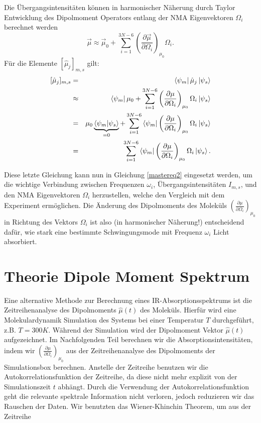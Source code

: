 \documentclass[a4paper,12pt]{article}
\begin{document}
Die Übergangsintensitäten können in harmonischer Näherung durch Taylor Entwicklung des Dipolmoment Operators entlang der NMA Eigenvektoren $\Omega_i$ berechnet werden
\begin{equation}\label{mutaylor}
 \vec{\mu} \approx  \vec{\mu}_0 + \sum_{i=1}^{3N-6} \left(\frac{\partial \vec{\mu}}{\partial \Omega_i}\right)_{\mu_0} \Omega_i.
\end{equation}
Für die Elemente $[\hat{\mu}_j]_{m,s}$ gilt:
\begin{eqnarray}\label{maximu}
  [\hat{\mu}_j]_{m,s}&=&\bra{\psi_m}\hat{\mu}_j \ket{\psi_s} \nonumber \\
                     &\approx&\bra{\psi_m} \mu_0 + \sum_{i=1}^{3N-6} \left(\frac{\partial \mu}{\partial \Omega_i}\right)_{\mu_0} \Omega_i \ket{\psi_s} \nonumber\\
                     &=&\mu_0 \underbrace{\braket{\psi_m|\psi_s}}_{=0} + \sum_{i=1}^{3N-6} \bra{\psi_m}  \left(\frac{\partial \mu}{\partial \Omega_i}\right)_{\mu_0} \Omega_i \ket{\psi_s} \nonumber\\
                     &=&\sum_{i=1}^{3N-6} \bra{\psi_m}  \left(\frac{\partial \mu}{\partial \Omega_i}\right)_{\mu_0} \Omega_i \ket{\psi_s}.
\end{eqnarray}

Diese letzte Gleichung kann nun in Gleichung \ref{mastereq2} eingesetzt werden, um die wichtige Verbindung zwischen Frequenzen $\omega_i$, Übergangsintensitäten $I_{m,s}$, und den NMA
Eigenvektoren $\Omega_i$ herzustellen, welche den Vergleich mit dem Experiment ermöglichen.
Die Änderung des Dipolmoments des Moleküls $\left(\frac{\partial \mu}{\partial \Omega_i}\right)_{\mu_0}$ in Richtung des Vektors $\Omega_i$ ist also (in harmonischer Näherung!) 
entscheidend dafür, wie stark eine bestimmte Schwingungsmode mit Frequenz $\omega_i$ Licht absorbiert.

\section{Theorie Dipole Moment Spektrum}\label{dipolespec}
Eine alternative Methode zur Berechnung eines IR-Absorptionsspektrums ist die Zeitreihenanalyse des Dipolmoments $\hat{\mu}(t)$ des Moleküls. Hierfür wird eine Molekulardynamik Simulation
des Systems bei einer Temperatur $T$ durchgeführt, z.B. $T=300K$. Während der Simulation wird der Dipolmoment Vektor $\hat{\mu}(t)$ aufgezeichnet. Im Nachfolgenden Teil berechnen wir die 
Absorptionsintensitäten, indem wir $\left(\frac{\partial \mu}{\partial \Omega_i}\right)_{\mu_0}$ aus der Zeitreihenanalyse des Dipolmoments der Simulationsbox berechnen. Anstelle der
Zeitreihe benutzen wir die Autokorrelationsfunktion der Zeitreihe, da diese nicht mehr explizit von der Simulationszeit $t$ abhängt. Durch die Verwendung der Autokorrelationsfunktion 
geht die relevante spektrale Information nicht verloren, jedoch reduzieren wir das Rauschen der Daten. Wir benutzten das Wiener-Khinchin Theorem, um aus der Zeitreihe 
\end{document}
